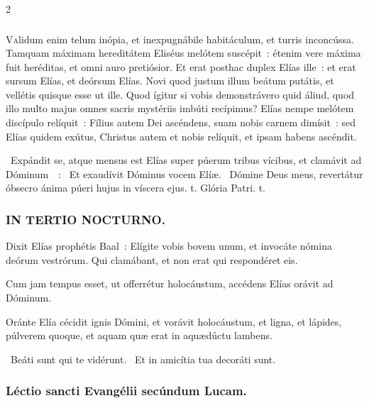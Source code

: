 \documentclass[9pt,twoside]{extarticle}
\begin{document}
\begin{multicols}{2}
{{\subsubsection*{\center {}}
\lettrine{V}alidum enim telum inópia, et inexpugnábile habitáculum, et turris inconcússa. Tamquam máximam hereditátem Eliséus melótem suscépit~: étenim vere máxima fuit heréditas, et omni auro pretiósior. Et erat posthac duplex Elías ille~: et erat sursum Elías, et deórsum Elías. Novi quod justum illum beátum putátis, et vellétis quisque esse ut ille. Quod ígitur si vobis demonstrávero quid áliud, quod illo multo majus omnes sacris mystériis imbúti recípimus? Elías nempe melótem discípulo relíquit~: Fílius autem Dei ascéndens, suam nobis carnem dimísit~: sed Elías quidem exútus, Christus autem et nobis relíquit, et ipsam habens ascéndit.

\begin{tightlist}{}
\item {}~Expándit se, atque mensus est Elías super púerum tribus vícibus, et clamávit ad Dóminum~~: \textred{*}~Et exaudívit Dóminus vocem Elíæ. ~Dómine Deus meus, revertátur óbsecro ánima púeri hujus in víscera ejus. t. Glória Patri. t.
\end{tightlist}

\subsubsection*{\center \textsc{IN TERTIO NOCTURNO.}}
\begin{tightlist}{}
\item {} Dixit Elías prophétis Baal~: Elígite vobis bovem unum, et invocáte nómina deórum vestrórum. Qui clamábant, et non erat qui respondéret eis.
\item {} Cum jam tempus esset, ut offerrétur holocáustum, accédens Elías orávit ad Dóminum.
\item {} Oránte Elía cécidit ignis Dómini, et vorávit holocáustum, et ligna, et lápides, púlverem quoque, et aquam quæ erat in aquædúctu lambens.
\item {}~Beáti sunt qui te vidérunt. ~Et in amicítia tua decoráti sunt.
\end{tightlist}

\subsubsection*{\center Léctio sancti Evangélii secúndum Lucam.}
}}
\end{multicols}
\end{document}
